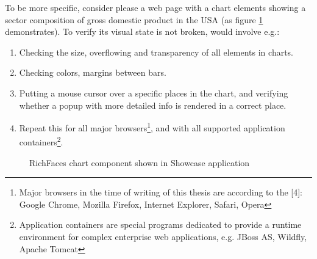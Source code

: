 \documentclass[11pt,oneside,final]{fithesis2}
\begin{document}
  To be more specific, consider please a web page with a chart elements showing a sector composition of gross domestic product in the USA (as figure \ref{fig:richfaces_chart} demonstrates).
  To verify its visual state is not broken, would involve e.g.:
  \begin{enumerate}
   \item Checking the size, overflowing and transparency of all elements in charts.
   \item Checking colors, margins between bars.
   \item Putting a mouse cursor over a specific places in the chart, and verifying whether a popup with more detailed info is rendered in a correct place.
   \item Repeat this for all major browsers\footnote{\label{footnote:majorBrowsers}Major browsers in the time of writing of this thesis are according to the [4]: Google Chrome, Mozilla Firefox, Internet Explorer, Safari, Opera}, 
   and with all supported application containers\footnote{Application containers are special programs 
   dedicated to provide a runtime environment for complex enterprise web applications, e.g. JBoss AS, Wildfly, Apache Tomcat}.
  \end{enumerate}
  
  \begin{figure}[!htb]
    \begin{center}
    \leavevmode
    \centerline{}
    \end{center}
    \caption{RichFaces chart component shown in Showcase application}
    \label{fig:richfaces_chart} 
  \end{figure}
  
\end{document}
